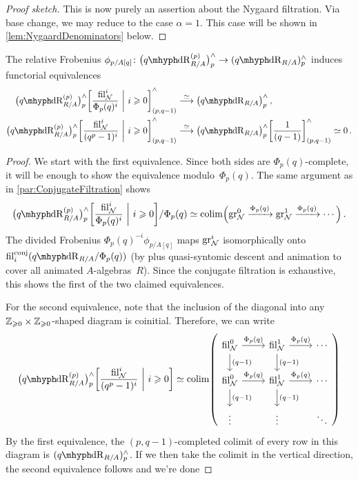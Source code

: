 \documentclass[DIV=12,numbers=enddot,leqno,bibliography=totoc]{scrartcl}
\begin{document}
\begin{proof}[Proof sketch]
		This is now purely an assertion about the Nygaard filtration. Via base change, we may reduce to the case $\alpha=1$. This case will be shown in \cref{lem:NygaardDenominators} below.
	\end{proof}
	\begin{lem}\label{lem:NygaardDenominators}
		The relative Frobenius $\phi_{p/A[q]}\colon \bigl(\qdeRham_{R/A}^{(p)}\bigr)_p^\complete\rightarrow (\qdeRham_{R/A})_p^\complete$ induces functorial equivalences
		\begin{align*}
			\bigl(\qdeRham_{R/A}^{(p)}\bigr)_p^\complete\left[\frac{ \fil_\Nn^i}{\Phi_p(q)^i}\ \middle|\ i\geqslant 0\right]_{(p,q-1)}^\complete&\overset{\simeq}{\longrightarrow} \left(\qdeRham_{R/A}\right)_p^\complete\,,\\	\bigl(\qdeRham_{R/A}^{(p)}\bigr)_p^\complete\left[\frac{ \fil_\Nn^i}{(q^p-1)^i}\ \middle|\ i\geqslant 0\right]_{(p,q-1)}^\complete&\overset{\simeq}{\longrightarrow} \left(\qdeRham_{R/A}\right)_p^\complete\left[\frac{1}{(q-1)}\right]_{(p,q-1)}^\complete\simeq 0\,.
		\end{align*}
	\end{lem}
	\begin{proof}
		We start with the first equivalence. Since both sides are $\Phi_p(q)$-complete, it will be enough to show the equivalence modulo~$\Phi_p(q)$. The same argument as in \cref{par:ConjugateFiltration} shows
		\begin{equation*}
			\bigl(\qdeRham_{R/A}^{(p)}\bigr)_p^\complete\left[\frac{ \fil_\Nn^i}{\Phi_p(q)^i}\ \middle|\ i\geqslant 0\right]/\Phi_p(q)\simeq \colimit\Bigl(\gr_\Nn^0\xrightarrow{\Phi_p(q)}\gr_\Nn^1\xrightarrow{\Phi_p(q)}\dotsb\Bigr)\,.
		\end{equation*}
		The divided Frobenius $\Phi_p(q)^{-i}\phi_{p/A[q]}$ maps $\operatorname{gr}_{\mathcal{N}}^i$ isomorphically onto $ \fil_i^\mathrm{conj}(\qdeRham_{R/A}/\Phi_p(q))$ (by \cite[Theorem~]{Prismatic} plus quasi-syntomic descent and animation to cover all animated $A$-algebras~$R$). Since the conjugate filtration is exhaustive, this shows the first of the two claimed equivalences.
		
		For the second equivalence, note that the inclusion of the diagonal into any $\mathbb{Z}_{\geqslant 0}\times \mathbb{Z}_{\geqslant 0}$-shaped diagram is coinitial. Therefore, we can write
		\begin{equation*}
			\bigl(\qdeRham_{R/A}^{(p)}\bigr)_p^\complete\left[\frac{ \fil_\Nn^i}{(q^p-1)^i}\ \middle|\ i\geqslant 0\right]\simeq \colimit\left(\begin{tikzcd}
				\fil_\Nn^0\dar["(q-1)"]\rar["\Phi_p(q)"] &  \fil_\Nn^1\dar["(q-1)"]\rar["\Phi_p(q)"] & \dotsb \\
				\fil_\Nn^0\dar["(q-1)"]\rar["\Phi_p(q)"] &  \fil_\Nn^1\dar["(q-1)"]\rar["\Phi_p(q)"] & \dotsb \\
				\vdots & \vdots & \ddots
			\end{tikzcd}\right)
		\end{equation*}
		By the first equivalence, the $(p,q-1)$-completed colimit of every row in this diagram is $(\qdeRham_{R/A})_p^\complete$. If we then take the colimit in the vertical direction, the second equivalence follows and we're done
	\end{proof}
	
\end{document}
